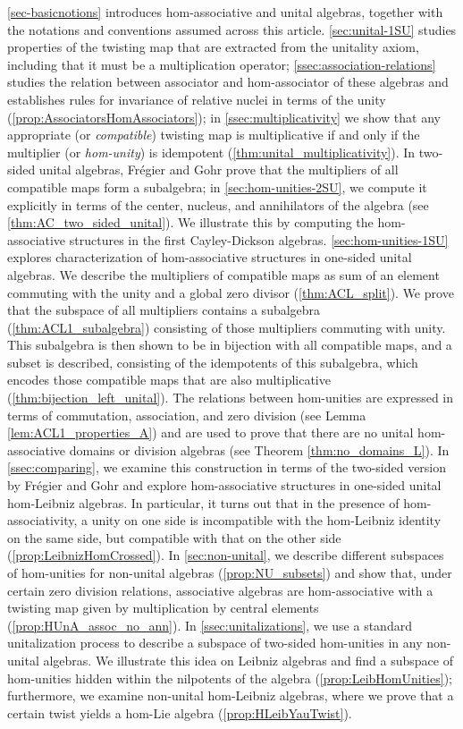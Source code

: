 \documentclass[12pt]{article}
\begin{document}
        \cref{sec-basicnotions} introduces hom-associative and unital algebras, together with the notations and conventions assumed across this article. \cref{sec:unital-1SU} studies properties of the twisting map that are extracted from the unitality axiom, including that it must be a multiplication operator; \cref{ssec:association-relations} studies the relation between associator and hom-associator of these algebras and establishes rules for invariance of relative nuclei in terms of the unity (\cref{prop:AssociatorsHomAssociators}); in \cref{ssec:multiplicativity} we show that any appropriate (or \textit{compatible}) twisting map is multiplicative if and only if the multiplier (or \textit{hom-unity}) is idempotent (\cref{thm:unital_multiplicativity}). In two-sided unital algebras, Fr\'{e}gier and Gohr \cite{FreGohr:UnitCond} prove that the multipliers of all compatible maps form a subalgebra; in \cref{sec:hom-unities-2SU}, we compute it explicitly in terms of the center, nucleus, and annihilators of the algebra (see \cref{thm:AC_two_sided_unital}). We illustrate this by computing the hom-associative structures in the first Cayley-Dickson algebras. \cref{sec:hom-unities-1SU} explores characterization of hom-associative structures in one-sided unital algebras. We describe the multipliers of compatible maps as sum of an element commuting with the unity and a global zero divisor (\cref{thm:ACL_split}). We prove that the subspace of all multipliers contains a subalgebra (\cref{thm:ACL1_subalgebra}) consisting of those multipliers commuting with unity. This subalgebra is then shown to be in bijection with all compatible maps, and a subset is described, consisting of the idempotents of this subalgebra, which encodes those compatible maps that are also multiplicative (\cref{thm:bijection_left_unital}). The relations between hom-unities are expressed in terms of commutation, association, and zero division (see Lemma \ref {lem:ACL1_properties_A}) and are used to prove that there are no unital hom-associative domains or division algebras (see Theorem \ref {thm:no_domains_L}). In \cref{ssec:comparing}, we examine this construction in terms of the two-sided version by Fr\'{e}gier and Gohr \cite{FreGohr:UnitCond} and explore hom-associative structures in one-sided unital hom-Leibniz algebras. In particular, it turns out that in the presence of hom-associativity, a unity on one side is incompatible with the hom-Leibniz identity on the same side, but compatible with that on the other side (\cref{prop:LeibnizHomCrossed}).  In \cref{sec:non-unital}, we describe different subspaces of hom-unities for non-unital algebras (\cref{prop:NU_subsets}) and show that, under certain zero division relations, associative algebras are hom-associative with a twisting map given by multiplication by central elements (\cref{prop:HUnA_assoc_no_ann}). In \cref{ssec:unitalizations}, we use a standard unitalization process to describe a subspace of two-sided hom-unities in any non-unital algebras. We illustrate this idea on Leibniz algebras and find a subspace of hom-unities hidden within the nilpotents of the algebra (\cref{prop:LeibHomUnities}); furthermore, we examine non-unital hom-Leibniz algebras, where we prove that a certain twist yields a hom-Lie algebra (\cref{prop:HLeibYauTwist}).
		
\end{document}
